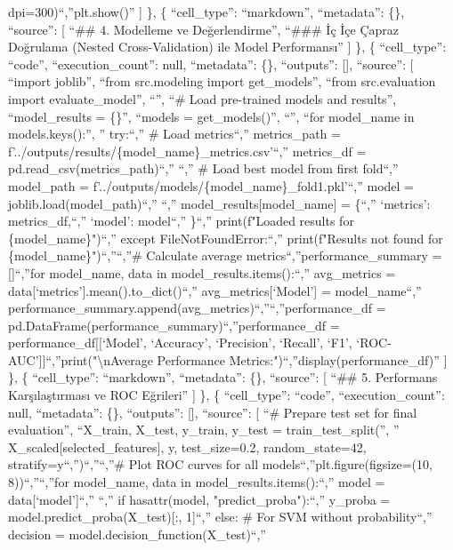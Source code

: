 \documentclass[11pt]{article}
\begin{document}
dpi=300)\n``,''plt.show()'' {]} \}, \{ ``cell\_type'': ``markdown'',
``metadata'': \{\}, ``source'': {[} ``\#\# 4. Modelleme ve
Değerlendirme\n'', ``\#\#\# İç İçe Çapraz Doğrulama (Nested
Cross-Validation) ile Model Performansı'' {]} \}, \{ ``cell\_type'':
``code'', ``execution\_count'': null, ``metadata'': \{\}, ``outputs'':
{[}{]}, ``source'': {[} ``import joblib\n'', ``from src.modeling import
get\_models\n'', ``from src.evaluation import evaluate\_model\n'',
``\n'', ``\# Load pre-trained models and results\n'', ``model\_results =
\{\}\n'', ``models = get\_models()\n'', ``\n'', ``for model\_name in
models.keys():\n'', '' try:\n``,'' \# Load metrics\n``,'' metrics\_path
= f'../outputs/results/\{model\_name\}\_metrics.csv'\n``,'' metrics\_df
= pd.read\_csv(metrics\_path)\n``,'' \n``,'' \# Load best model from
first fold\n``,'' model\_path =
f'../outputs/models/\{model\_name\}\_fold1.pkl'\n``,'' model =
joblib.load(model\_path)\n``,'' \n``,'' model\_results{[}model\_name{]}
= \{\n``,'' `metrics': metrics\_df,\n``,'' `model': model\n``,''
\}\n``,'' print(f"Loaded results for \{model\_name\}")\n``,'' except
FileNotFoundError:\n``,'' print(f"Results not found for
\{model\_name\}")\n``,''\n``,''\# Calculate average
metrics\n``,''performance\_summary = {[}{]}\n``,''for model\_name, data
in model\_results.items():\n``,'' avg\_metrics =
data{[}`metrics'{]}.mean().to\_dict()\n``,'' avg\_metrics{[}`Model'{]} =
model\_name\n``,''
performance\_summary.append(avg\_metrics)\n``,''\n``,''performance\_df =
pd.DataFrame(performance\_summary)\n``,''performance\_df =
performance\_df{[}{[}`Model', `Accuracy', `Precision', `Recall', `F1',
`ROC-AUC'{]}{]}\n``,''print("\textbackslash nAverage Performance
Metrics:")\n``,''display(performance\_df)'' {]} \}, \{ ``cell\_type'':
``markdown'', ``metadata'': \{\}, ``source'': {[} ``\#\# 5. Performans
Karşılaştırması ve ROC Eğrileri'' {]} \}, \{ ``cell\_type'': ``code'',
``execution\_count'': null, ``metadata'': \{\}, ``outputs'': {[}{]},
``source'': {[} ``\# Prepare test set for final evaluation\n'',
``X\_train, X\_test, y\_train, y\_test = train\_test\_split(\n'', ''
X\_scaled{[}selected\_features{]}, y, test\_size=0.2, random\_state=42,
stratify=y\n``,'')\n``,''\n``,''\# Plot ROC curves for all
models\n``,''plt.figure(figsize=(10, 8))\n``,''\n``,''for model\_name,
data in model\_results.items():\n``,'' model = data{[}`model'{]}\n``,''
\n``,'' if hasattr(model, "predict\_proba"):\n``,'' y\_proba =
model.predict\_proba(X\_test){[}:, 1{]}\n``,'' else: \# For SVM without
probability\n``,'' decision = model.decision\_function(X\_test)\n``,''
\end{document}
